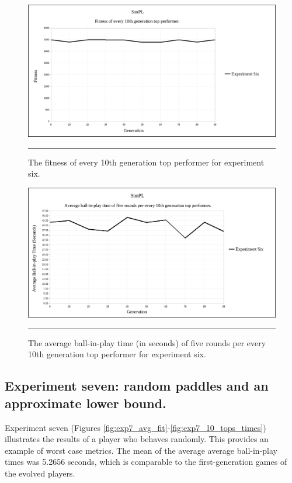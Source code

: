 \begin{figure}[ht!]  
  \centering
  \includegraphics[width=5in]{../Figures/Chapter3/exp6_10_tops.png}
  \rule{35em}{0.5pt}
  \caption[Experiment Six Top Performers]{The fitness of every 10th generation top performer for experiment six.}
  \label{fig:exp6_10_tops}
\end{figure}

\begin{figure}[ht!]  
  \centering
  \includegraphics[width=5in]{../Figures/Chapter3/exp6_10_tops_times.png}
  \rule{35em}{0.5pt}
  \caption[Experiment Six Top Performers Tournament]{The average ball-in-play time (in seconds) of five rounds per every 10th generation top performer for experiment six.}
  \label{fig:exp6_10_tops_times}
\end{figure}

\subsection[Experiment Seven]{Experiment seven: random paddles and an approximate lower bound.}
\label{ssec:experiment_seven}

Experiment seven (Figures \ref{fig:exp7_avg_fit}-\ref{fig:exp7_10_tops_times}) illustrates the results of a player who behaves randomly. This provides an example of worst case metrics. The mean of the average average ball-in-play times was 5.2656 seconds, which is comparable to the first-generation games of the evolved players.

